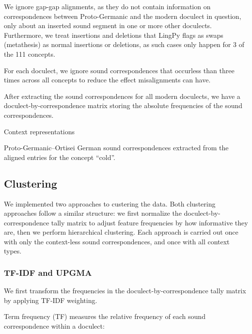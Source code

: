 \documentclass[a4paper]{article}
\begin{document}
We ignore gap-gap alignments,
as they do not contain information on correspondences
between Proto-Germanic and the modern doculect in question,
only about an inserted sound segment in one or more other doculects.
Furthermore, we treat insertions and deletions
that LingPy flags as swaps (metathesis) as normal insertions or deletions,
as such cases only happen for 3 of the 111 concepts.

For each doculect, we ignore sound correspondences
that occurless than three times across all concepts
to reduce the effect misalignments can have. 

After extracting the sound correspondences for
all modern doculects, we have a doculect-by-correspondence
matrix storing the absolute frequencies of the sound correspondences.

\begin{table}[]

\caption{Context representations}
\label{tab:context}
\end{table}

\begin{table}[h]

\caption{
Proto-Germanic--Ortisei German sound correspondences
extracted from the aligned entries for the concept ``cold''.}
\label{tab:corres}
\end{table}


\subsection{Clustering}
\label{subsec:clustering}

We implemented two approaches to custering the data.
Both clustering approaches follow a similar structure:
we first normalize the doculect-by-correspondence tally matrix
to adjust feature frequencies by how informative they are,
then we perform hierarchical clustering.
Each approach is carried out once with only
the context-less sound correspondences,
and once with all context types.

\subsubsection{TF-IDF and UPGMA}
\label{subsubsec:upgma}

We first transform the frequencies
in the doculect-by-correspondence tally matrix
by applying TF-IDF weighting.


Term frequency (TF) measures the relative frequency
of each sound correspondence within a doculect:
\end{document}
